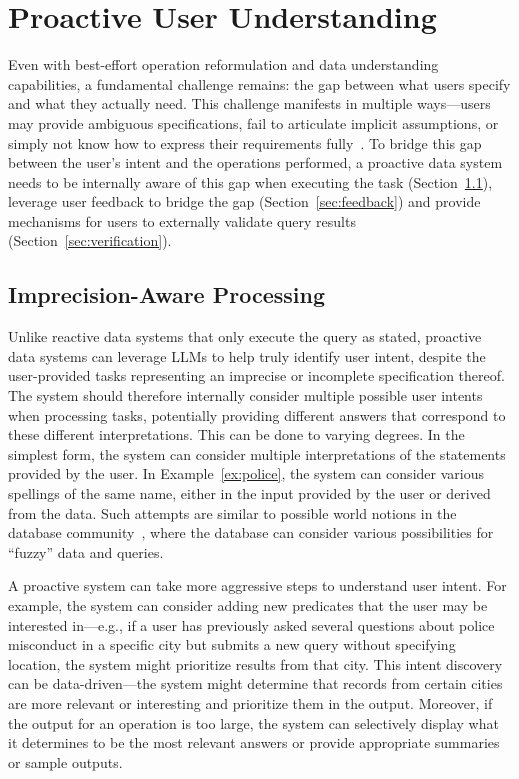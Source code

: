 

\section{Proactive User Understanding }\label{sec:intent}

Even with best-effort operation reformulation 
and data understanding capabilities, 
a fundamental challenge remains: the gap between what users specify 
and what they actually need. 
This challenge manifests in multiple ways---users may provide ambiguous specifications, 
fail to articulate implicit assumptions, 
or simply not know how to express their requirements fully~\cite{papicchio2024evaluating, shankar2024validates}. 
To bridge this gap between the user's intent and the operations performed, 
a proactive data system needs to be internally 
aware of this gap when executing the task (Section~\ref{sec:internal}), 
leverage user feedback to bridge the gap (Section~\ref{sec:feedback}) 
and provide mechanisms for users to externally validate query results (Section~\ref{sec:verification}). 

\subsection{Imprecision-Aware Processing}\label{sec:internal}

Unlike reactive data systems
that only execute the query as stated, proactive
data systems can leverage LLMs to help truly
identify user intent,
despite the user-provided tasks representing
an imprecise or incomplete specification thereof. 
The system should therefore internally consider 
multiple possible user intents when processing tasks, 
potentially providing different answers that correspond 
to these different interpretations. This can be done to varying degrees. 
In the simplest form, the system can consider multiple interpretations 
of the statements provided by the user. 
In Example~\ref{ex:police}, the system can consider 
various spellings of the same name, 
either in the input provided by the user or derived from the data. 
Such attempts are similar to 
possible world notions in the database community~\cite{suciu2022probabilistic}, 
where the database can consider various possibilities for ``fuzzy'' data and queries.

A proactive system can take 
more aggressive steps to understand user intent. 
For example, the system can consider adding new predicates 
that the user may be interested in---e.g., 
if a user has previously asked several questions about police misconduct 
in a specific city but submits a new query without specifying location, the system might prioritize results from that city. 
This intent discovery can be data-driven---the system might determine that records from certain cities are more relevant 
or interesting 
and prioritize them in the output. 
Moreover, if the output for an operation is too large, the system can 
selectively display what it determines to be the most relevant answers 
or provide appropriate summaries or sample outputs.

